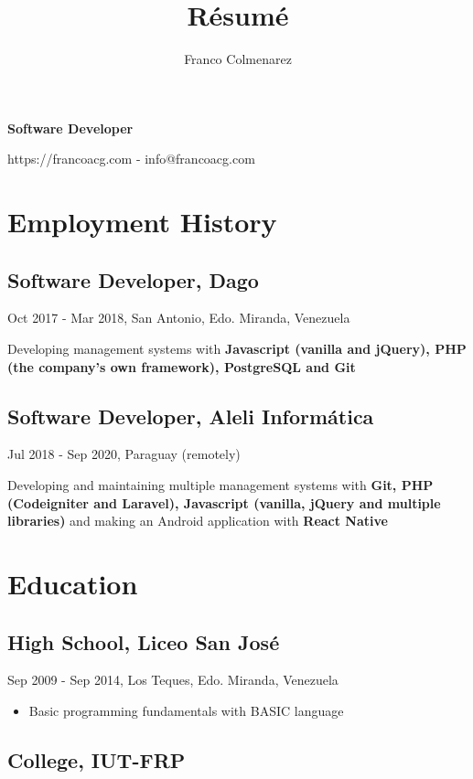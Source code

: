 \documentclass{article}
\author{Franco Colmenarez}
\title{R\'esum\'e}
\makeatletter
\renewcommand{\maketitle}{
\begin{center}
{\huge\bfseries\theauthor}

\vspace{.25em}

{\large\bfseries Software Developer}

\vspace{.25em}

https://francoacg.com - info@francoacg.com

\end{center}
}
\makeatother
\begin{document}
\maketitle

\section{Employment History}

\subsection{Software Developer, Dago}

Oct 2017 - Mar 2018, San Antonio, Edo. Miranda, Venezuela

\vspace{.25em}

Developing management systems with \textbf{Javascript (vanilla and jQuery), PHP (the company's own framework), PostgreSQL and Git}

\subsection{Software Developer, Aleli Inform\'atica}

Jul 2018 - Sep 2020, Paraguay (remotely)

\vspace{.25em}

Developing and maintaining multiple management systems with
\textbf{Git, PHP (Codeigniter and Laravel), Javascript (vanilla, jQuery and multiple libraries)}
and making an Android application with \textbf{React Native}

\section{Education}

\subsection{High School, Liceo San Jos\'e}

Sep 2009 - Sep 2014, Los Teques, Edo. Miranda, Venezuela

\begin{itemize}
    \item Basic programming fundamentals with BASIC language
\end{itemize}

\subsection{College, IUT-FRP}
\end{document}
